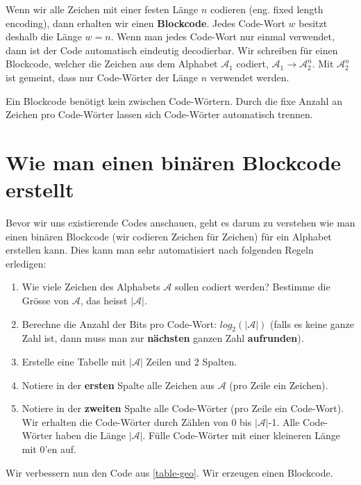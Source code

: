 \begin{definition}[Blockcode]
Wenn wir alle Zeichen mit einer festen Länge $n$ codieren (eng. fixed length encoding), dann erhalten wir einen \textbf{Blockcode}. Jedes Code-Wort $w$ besitzt deshalb die Länge $w = n$. Wenn man jedes Code-Wort nur einmal verwendet, dann ist der Code automatisch eindeutig decodierbar. Wir schreiben für einen Blockcode, welcher die Zeichen aus dem Alphabet $\mathscr{A}_1$ codiert, $\mathscr{A}_1 \rightarrow \mathscr{A}_2^n$. Mit $\mathscr{A}_2^n$ ist gemeint, dass nur Code-Wörter der Länge $n$ verwendet werden.
\end{definition}

Ein Blockcode benötigt kein  zwischen Code-Wörtern. Durch die fixe Anzahl an Zeichen pro Code-Wörter lassen sich Code-Wörter automatisch trennen.

\section{Wie man einen binären Blockcode erstellt}

Bevor wir uns existierende Codes anschauen, geht es darum zu verstehen wie man einen binären Blockcode (wir codieren Zeichen für Zeichen) für ein Alphabet erstellen kann. Dies kann man sehr automatisiert nach folgenden Regeln erledigen:

\begin{enumerate}
\item Wie viele Zeichen des Alphabets $\mathscr{A}$ sollen codiert werden? Bestimme die Grösse von $\mathscr{A}$, das heisst $|\mathscr{A}|$.
\item Berechne die Anzahl der Bits pro Code-Wort: $log_2(|\mathscr{A}|)$ (falls es keine ganze Zahl ist, dann muss man zur \textbf{nächsten} ganzen Zahl \textbf{aufrunden}).
\item Erstelle eine Tabelle mit $|\mathscr{A}|$ Zeilen und 2 Spalten.
\item Notiere in der \textbf{ersten} Spalte alle Zeichen aus $\mathscr{A}$ (pro Zeile ein Zeichen).
\item Notiere in der \textbf{zweiten} Spalte alle Code-Wörter (pro Zeile ein Code-Wort). Wir erhalten die Code-Wörter durch  Zählen von $0$ bis $|\mathscr{A}|$-1. Alle Code-Wörter haben die Länge $|\mathscr{A}|$. Fülle Code-Wörter mit einer kleineren Länge mit $0$'en auf.
\end{enumerate}

Wir verbessern nun den Code aus \autoref{table-geo}. Wir erzeugen einen Blockcode.

